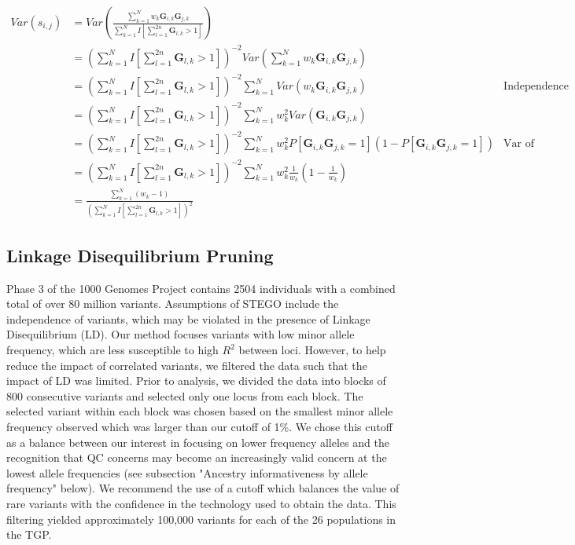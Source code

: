 \begin{align*}
Var\left(s_{i,j}\right) & =Var\left(\frac{\sum_{k=1}^{N}w_{k}\mathbf{G}_{i,k}\mathbf{G}_{j,k}}{\sum_{k=1}^{N}I\left[\sum_{l=1}^{2n}\mathbf{G}_{l,k}>1\right]}\right)\\
 & =\left(\sum_{k=1}^{N}I\left[\sum_{l=1}^{2n}\mathbf{G}_{l,k}>1\right]\right)^{-2}Var\left(\sum_{k=1}^{N}w_{k}\mathbf{G}_{i,k}\mathbf{G}_{j,k}\right)\\
 & =\left(\sum_{k=1}^{N}I\left[\sum_{l=1}^{2n}\mathbf{G}_{l,k}>1\right]\right)^{-2}\sum_{k=1}^{N}Var\left(w_{k}\mathbf{G}_{i,k}\mathbf{G}_{j,k}\right) & \text{Independence}\\
 & =\left(\sum_{k=1}^{N}I\left[\sum_{l=1}^{2n}\mathbf{G}_{l,k}>1\right]\right)^{-2}\sum_{k=1}^{N}w_{k}^{2}Var\left(\mathbf{G}_{i,k}\mathbf{G}_{j,k}\right)\\
 & =\left(\sum_{k=1}^{N}I\left[\sum_{l=1}^{2n}\mathbf{G}_{l,k}>1\right]\right)^{-2}\sum_{k=1}^{N}w_{k}^{2}P\left[\mathbf{G}_{i,k}\mathbf{G}_{j,k}=1\right]\left(1-P\left[\mathbf{G}_{i,k}\mathbf{G}_{j,k}=1\right]\right) & \text{Var of Bernouli}\\
 & =\left(\sum_{k=1}^{N}I\left[\sum_{l=1}^{2n}\mathbf{G}_{l,k}>1\right]\right)^{-2}\sum_{k=1}^{N}w_{k}^{2}\frac{1}{w_{k}}\left(1-\frac{1}{w_{k}}\right)\\
 & =\frac{\sum_{k=1}^{N}\left(w_{k}-1\right)}{\left(\sum_{k=1}^{N}I\left[\sum_{l=1}^{2n}\mathbf{G}_{l,k}>1\right]\right)^{2}}
\end{align*}


\subsection{Linkage Disequilibrium Pruning}

Phase 3 of the 1000 Genomes Project contains 2504 individuals with
a combined total of over 80 million variants. Assumptions of STEGO
include the independence of variants, which may be violated in the
presence of Linkage Disequilibrium (LD). Our method focuses variants
with low minor allele frequency, which are less susceptible to high
$R^{2}$ between loci. However, to help reduce the impact of correlated
variants, we filtered the data such that the impact of LD was limited.
Prior to analysis, we divided the data into blocks of 800 consecutive
variants and selected only one locus from each block. The selected
variant within each block was chosen based on the smallest minor allele
frequency observed which was larger than our cutoff of 1\%. We chose
this cutoff as a balance between our interest in focusing on lower
frequency alleles and the recognition that QC concerns may become
an increasingly valid concern at the lowest allele frequencies (see
subsection "Ancestry informativeness by allele frequency" below). We recommend the use of a cutoff which
balances the value of rare variants with the confidence in the technology
used to obtain the data. This filtering yielded approximately 100,000
variants for each of the 26 populations in the TGP. 

